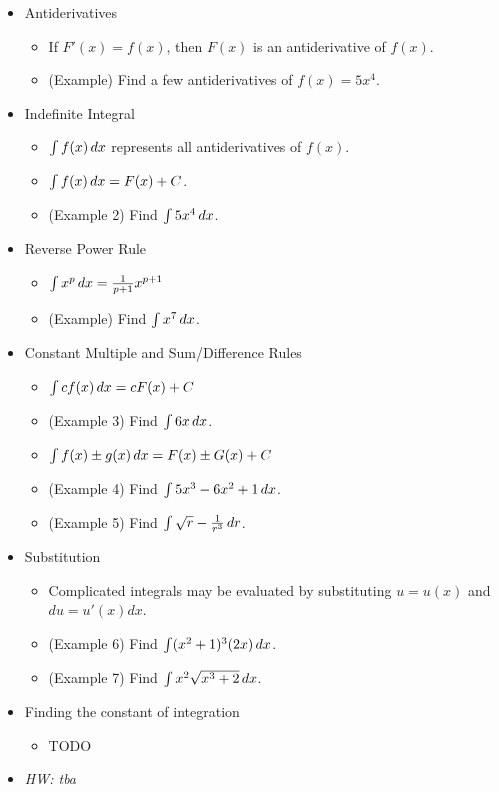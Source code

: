 \documentclass[11pt]{article}
\begin{document}
\begin{itemize}
\item Antiderivatives
  \begin{itemize}
    \item If \(F'(x)=f(x)\), then \(F(x)\) is an antiderivative of \(f(x)\).
    \item (Example) Find a few antiderivatives of \(f(x)=5x^4\).
  \end{itemize}
\item Indefinite Integral
  \begin{itemize}
    \item \(\int f(x)\,d x\) represents all antiderivatives of \(f(x)\).
    \item \(\int f(x)\,d x=F(x)+C\).
    \item (Example 2) Find \(\int 5x^4 \,d x\).
  \end{itemize}
\item Reverse Power Rule
  \begin{itemize}
    \item \(\int x^p\,d x = \frac{1}{p+1}x^{p+1}\)
    \item (Example) Find \(\int x^7\,d x\).
  \end{itemize}
\item Constant Multiple and Sum/Difference Rules
  \begin{itemize}
    \item \(\int cf(x)\,d x=cF(x)+C\)
    \item (Example 3) Find \(\int 6x\,d x\).
    \item \(\int f(x)\pm g(x)\,d x=F(x)\pm G(x)+C\)
    \item (Example 4) Find \(\int 5x^3-6x^2+1\,d x\).
    \item (Example 5) Find \(\int \sqrt r - \frac{1}{r^3}\,d r\).
  \end{itemize}
\item Substitution
  \begin{itemize}
    \item Complicated integrals may be evaluated by substituting \(u=u(x)\)
          and \(du=u'(x)dx\).
    \item (Example 6) Find \(\int(x^2+1)^3(2x)\,d x\).
    \item (Example 7) Find \(\int x^2\sqrt{x^3+2}\,d x\).
  \end{itemize}
\item Finding the constant of integration
  \begin{itemize}
    \item TODO
  \end{itemize}
\item\textit{
  HW: tba
}
\end{itemize}
\end{document}
